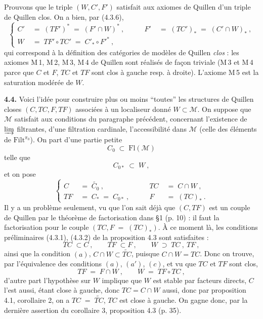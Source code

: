 \documentclass[11pt]{article}
\newcommand{\printedpage}[1]{\marginpar{\footnotesize p.~#1}}
\newcommand{\msp}[1]{\marginpar{\footnotesize [#1]}}
\newcommand{\Fl}{\mathrm{Fl}}
\begin{document}
Prouvons que le triple $(W,C',F')$ satisfait aux axiomes de Quillen d'un triple de Quillen clos. On a bien, par (4.3.6),
\[
\left\{
\begin{aligned}
C' &\;=\;(TF')^*\;=\;(F'\cap W)^*\ , &\qquad F' &\;=\;(TC')_*\;=\;(C'\cap W)_*\ ,\\
W &\;=\;TF'\circ TC'\;=\;C'_*\circ F'^*\ ,
\end{aligned}
\right.
\]
qui correspond à la définition des catégories de modèles de Quillen \textit{clos} : les axiomes M\,1, M\,2, M\,3, M\,4 de Quillen sont réalisés de façon triviale (M\,3 et M\,4 parce que
\msp{page 37}
$C$ et $F$, $TC$ et $TF$ sont clos à gauche resp. à droite). L'axiome M\,5 est la saturation modérée de $W$.

\textbf{4.4.} Voici l'idée pour construire plus ou moins “toutes” les structures de Quillen closes $(C,TC,F,TF)$ associées à un localiseur donné $W\subset\mathcal{M}$. On suppose que $\mathcal{M}$ satisfait aux conditions du paragraphe précédent, concernant l'existence de $\varinjlim$ filtrantes, d'une filtration cardinale, l'accessibilité dans $\mathcal{M}$ (celle des éléments de $\mathrm{Filt}^{\pi_0}$). On part d'une partie petite
\[
C_0\;\subset\;\Fl(\mathcal{M})
\]
telle que
\[
C_{0*}\;\subset\;W\ , \tag*{(4.4.1)}
\]
et on pose
\[
\left\{
\begin{aligned}
C &\;=\;\widetilde{C_0}\ , &\qquad TC &\;=\;C\cap W\ ,\\
TF &\;=\;C_*\;=\;C_{0*}\ , &\qquad F &\;=\;(TC)_*\ .
\end{aligned}
\right.
\tag*{(4.4.2)}
\]
Il y a un problème seulement, vu que l'on sait déjà que $(C,TF)$ est un couple de Quillen par le théorème de factorisation dans §1 (p. 10) : il faut la factorisation pour le couple $(TC,F\;=\;(TC)_*)$. À ce moment là, les conditions préliminaires (4.3.1), (4.3.2) de la proposition 4.3 sont satisfaites :
\[
TC\;\subset C\ ,\qquad TF\;\subset F\ ,\qquad W\;\supset\;TC\ ,\ TF\ ,
\]
ainsi que la condition $(a)$, $C\cap W\subset\widetilde{TC}$, puisque $C\cap W=TC$. Donc on trouve, par l'équivalence des conditions $(a)$, $(a')$, $(c)$, et vu que $TC$ et $TF$ sont clos,
\[
TF\;=\;F\cap W\ ,\qquad W\;=\;TF\circ TC\ ,
\]
\printedpage{26}
\msp{page 38}
d'autre part l'hypothèse sur $W$ implique que $W$ est stable par facteurs directs, $C$ l'est aussi, étant close à gauche, donc $TC=C{\cap}W$ aussi, donc par proposition 4.1, corollaire 2, on a $TC\;=\;\widetilde{TC}$, $TC$ est close à gauche. On gagne donc, par la dernière assertion du corollaire 3, proposition 4.3 (p. 35).
\end{document}

